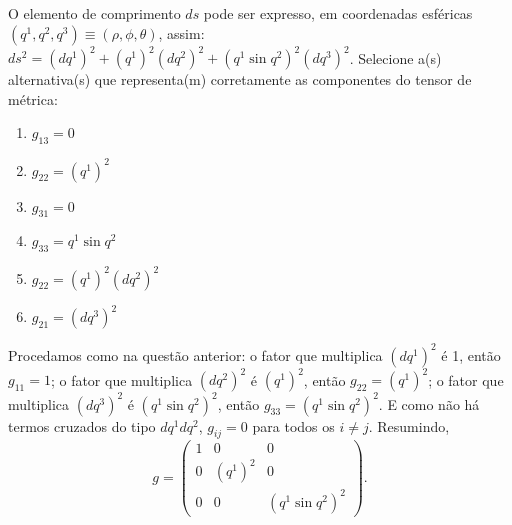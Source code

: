 \begin{question}
    O elemento de comprimento $ds$ pode ser expresso, em coordenadas esféricas $(q^1, q^2, q^3) \equiv (\rho, \phi, \theta)$, assim: $ds^2 = (dq^1)^2 + (q^1)^2 (dq^2)^2 + (q^1 \sin q^2)^2 (dq^3)^2$.
    Selecione a(s) alternativa(s) que representa(m) corretamente as componentes do tensor de métrica:
    \begin{enumerate}
      \item $g_{13} = 0$ \rightanswer
      \item $g_{22} = (q^1)^2$ \rightanswer
      \item $g_{31} = 0$ \rightanswer
      \item $g_{33} = q^1 \sin q^2$
      \item $g_{22} = (q^1)^2 (dq^2)^2$
      \item $g_{21} = (dq^3)^2$
    \end{enumerate}

    \begin{solution}
      Procedamos como na questão anterior: o fator que multiplica $(dq^1)^2$ é 1, então $g_{11} = 1$;
      o fator que multiplica $(dq^2)^2$ é $(q^1)^2$, então $g_{22} = (q^1)^2$;
      o fator que multiplica $(dq^3)^2$ é $(q^1 \sin q^2)^2$, então $g_{33} = (q^1 \sin q^2)^2$.
      E como não há termos cruzados do tipo $dq^1 dq^2$, $g_{ij} = 0$ para todos os $i \ne j$.
      Resumindo,
      \begin{equation*}
        g = \begin{pmatrix}
          1 &       0 & 0 \\
          0 & (q^1)^2 & 0 \\
          0 &       0 & (q^1 \sin q^2)^2
        \end{pmatrix}.
      \end{equation*}
    \end{solution}
\end{question}